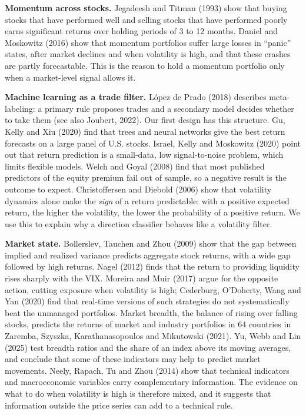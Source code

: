\documentclass[11pt]{article}
\begin{document}
\textbf{Momentum across stocks.} Jegadeesh and Titman (1993) show that buying stocks that have performed well and selling stocks that have performed poorly earns significant returns over holding periods of 3 to 12 months. Daniel and Moskowitz (2016) show that momentum portfolios suffer large losses in ``panic'' states, after market declines and when volatility is high, and that these crashes are partly forecastable. This is the reason to hold a momentum portfolio only when a market-level signal allows it.

\textbf{Machine learning as a trade filter.} López de Prado (2018) describes meta-labeling: a primary rule proposes trades and a secondary model decides whether to take them (see also Joubert, 2022). Our first design has this structure. Gu, Kelly and Xiu (2020) find that trees and neural networks give the best return forecasts on a large panel of U.S. stocks. Israel, Kelly and Moskowitz (2020) point out that return prediction is a small-data, low signal-to-noise problem, which limits flexible models. Welch and Goyal (2008) find that most published predictors of the equity premium fail out of sample, so a negative result is the outcome to expect. Christoffersen and Diebold (2006) show that volatility dynamics alone make the \emph{sign} of a return predictable: with a positive expected return, the higher the volatility, the lower the probability of a positive return. We use this to explain why a direction classifier behaves like a volatility filter.

\textbf{Market state.} Bollerslev, Tauchen and Zhou (2009) show that the gap between implied and realized variance predicts aggregate stock returns, with a wide gap followed by high returns. Nagel (2012) finds that the return to providing liquidity rises sharply with the VIX. Moreira and Muir (2017) argue for the opposite action, cutting exposure when volatility is high; Cederburg, O'Doherty, Wang and Yan (2020) find that real-time versions of such strategies do not systematically beat the unmanaged portfolios. Market breadth, the balance of rising over falling stocks, predicts the returns of market and industry portfolios in 64 countries in Zaremba, Szyszka, Karathanasopoulos and Mikutowski (2021). Yu, Webb and Lin (2025) test breadth ratios and the share of an index above its moving averages, and conclude that some of these indicators may help to predict market movements. Neely, Rapach, Tu and Zhou (2014) show that technical indicators and macroeconomic variables carry complementary information. The evidence on what to do when volatility is high is therefore mixed, and it suggests that information outside the price series can add to a technical rule.
\end{document}
